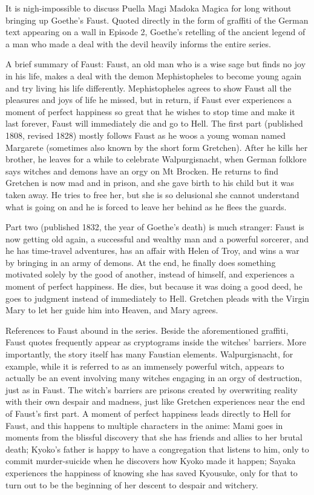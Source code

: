 It is nigh-impossible to discuss Puella Magi Madoka Magica for long without bringing up Goethe's Faust. Quoted directly in the form of graffiti of the German text appearing on a wall in Episode 2, Goethe's retelling of the ancient legend of a man who made a deal with the devil heavily informs the entire series.

A brief summary of Faust: Faust, an old man who is a wise sage but finds no joy in his life, makes a deal with the demon Mephistopheles to become young again and try living his life differently. Mephistopheles agrees to show Faust all the pleasures and joys of life he missed, but in return, if Faust ever experiences a moment of perfect happiness so great that he wishes to stop time and make it last forever, Faust will immediately die and go to Hell. The first part (published 1808, revised 1828) mostly follows Faust as he woos a young woman named Margarete (sometimes also known by the short form Gretchen). After he kills her brother, he leaves for a while to celebrate Walpurgisnacht, when German folklore says witches and demons have an orgy on Mt Brocken. He returns to find Gretchen is now mad and in prison, and she gave birth to his child but it was taken away. He tries to free her, but she is so delusional she cannot understand what is going on and he is forced to leave her behind as he flees the guards. \cite{ref94}

Part two (published 1832, the year of Goethe's death) is much stranger: Faust is now getting old again, a successful and wealthy man and a powerful sorcerer, and he has time-travel adventures, has an affair with Helen of Troy, and wins a war by bringing in an army of demons. At the end, he finally does something motivated solely by the good of another, instead of himself, and experiences a moment of perfect happiness. He dies, but because it was doing a good deed, he goes to judgment instead of immediately to Hell. Gretchen pleads with the Virgin Mary to let her guide him into Heaven, and Mary agrees. \cite{ref95}

References to Faust abound in the series. Beside the aforementioned graffiti, Faust quotes frequently appear as cryptograms inside the witches' barriers. More importantly, the story itself has many Faustian elements. Walpurgisnacht, for example, while it is referred to as an immensely powerful witch, appears to actually be an event involving many witches engaging in an orgy of destruction, just as in Faust. The witch's barriers are prisons created by overwriting reality with their own despair and madness, just like Gretchen experiences near the end of Faust's first part. A moment of perfect happiness leads directly to Hell for Faust, and this happens to multiple characters in the anime: Mami goes in moments from the blissful discovery that she has friends and allies to her brutal death; Kyoko's father is happy to have a congregation that listens to him, only to commit murder-suicide when he discovers how Kyoko made it happen; Sayaka experiences the happiness of knowing she has saved Kyousuke, only for that to turn out to be the beginning of her descent to despair and witchery.

